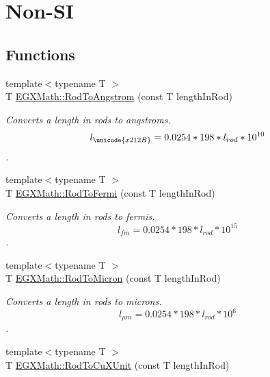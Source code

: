 \hypertarget{group___e_g_x_math-_conversions-_length_conversions-_imperial-_rod-_non-_s_i}{}\section{Non-\/\+SI}
\label{group___e_g_x_math-_conversions-_length_conversions-_imperial-_rod-_non-_s_i}
\subsection*{Functions}
\begin{DoxyCompactItemize}
\item 
{\footnotesize template$<$typename T $>$ }\\T \mbox{\hyperlink{group___e_g_x_math-_conversions-_length_conversions-_imperial-_rod-_non-_s_i_ga079b9122c8747685d7057ec05fefdb7f}{E\+G\+X\+Math\+::\+Rod\+To\+Angstrom}} (const T length\+In\+Rod)
\begin{DoxyCompactList}\small\item\em Converts a length in rods to angstroms. \[ l_{\unicode{x212B}}=0.0254 * 198 * l_{rod} * 10^{10} \]. \end{DoxyCompactList}\item 
{\footnotesize template$<$typename T $>$ }\\T \mbox{\hyperlink{group___e_g_x_math-_conversions-_length_conversions-_imperial-_rod-_non-_s_i_ga8397c0761e32cb6cfa632854d26023a5}{E\+G\+X\+Math\+::\+Rod\+To\+Fermi}} (const T length\+In\+Rod)
\begin{DoxyCompactList}\small\item\em Converts a length in rods to fermis. \[ l_{fm}=0.0254 * 198 * l_{rod} * 10^{15} \]. \end{DoxyCompactList}\item 
{\footnotesize template$<$typename T $>$ }\\T \mbox{\hyperlink{group___e_g_x_math-_conversions-_length_conversions-_imperial-_rod-_non-_s_i_ga91daf7bb89d486f6c8523a5436e5599d}{E\+G\+X\+Math\+::\+Rod\+To\+Micron}} (const T length\+In\+Rod)
\begin{DoxyCompactList}\small\item\em Converts a length in rods to microns. \[ l_{\mu m}=0.0254 * 198 * l_{rod} * 10^{6} \]. \end{DoxyCompactList}\item 
{\footnotesize template$<$typename T $>$ }\\T \mbox{\hyperlink{group___e_g_x_math-_conversions-_length_conversions-_imperial-_rod-_non-_s_i_gac344dc1fbafaa0451704947bf33a8594}{E\+G\+X\+Math\+::\+Rod\+To\+Cu\+X\+Unit}} (const T length\+In\+Rod)

\end{DoxyCompactItemize}
